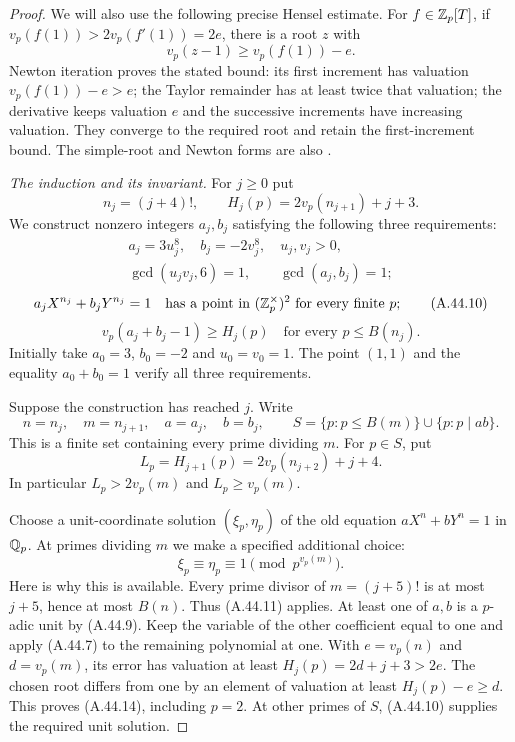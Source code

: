 \begin{proof}
We will also use the following precise Hensel estimate.
For $f\in\mathbb Z_p[T]$, if
$v_p(f(1))>2v_p(f'(1))=2e$, there is a root $z$
with
\[
                 v_p(z-1)\ge v_p(f(1))-e.
 \tag{A.44.7}
\]
Newton iteration proves the stated bound: its first
increment has valuation $v_p(f(1))-e>e$; the Taylor
remainder has at least twice that valuation; the
derivative keeps valuation $e$ and the successive
increments have increasing valuation. They converge
to the required root and retain the first-increment
bound. The simple-root and Newton forms are also
\cite[Proposition 7.31 and Theorem 7.32]{AgentMilneANT}.

\emph{The induction and its invariant.}
For $j\ge0$ put
\[
 n_j=(j+4)!,\qquad
 H_j(p)=2v_p(n_{j+1})+j+3.
 \tag{A.44.8}
\]
We construct nonzero integers $a_j,b_j$ satisfying
the following three requirements:
\[
 \begin{gathered}
 a_j=3u_j^8,\quad b_j=-2v_j^8,\quad u_j,v_j>0,\\
 \gcd(u_jv_j,6)=1,\qquad \gcd(a_j,b_j)=1;
 \end{gathered}
 \tag{A.44.9}
\]
\[
 a_jX^{n_j}+b_jY^{n_j}=1
 \quad\text{has a point in }(\mathbb Z_p^\times)^2
       \text{ for every finite }p;
 \tag{A.44.10}
\]
\[
 v_p(a_j+b_j-1)\ge H_j(p)
       \quad\text{for every }p\le B(n_j).
 \tag{A.44.11}
\]
Initially take $a_0=3$, $b_0=-2$ and
$u_0=v_0=1$. The point $(1,1)$ and the equality
$a_0+b_0=1$ verify all three requirements.

Suppose the construction has reached $j$. Write
\[
 n=n_j,\quad m=n_{j+1},\quad a=a_j,\quad b=b_j,
 \qquad
 S=\{p:p\le B(m)\}\cup\{p:p\mid ab\}.
 \tag{A.44.12}
\]
This is a finite set containing every prime dividing
$m$. For $p\in S$, put
\[
 L_p=H_{j+1}(p)=2v_p(n_{j+2})+j+4.
 \tag{A.44.13}
\]
In particular $L_p>2v_p(m)$ and
$L_p\ge v_p(m)$.

Choose a unit-coordinate solution $(\xi_p,\eta_p)$
of the old equation $aX^n+bY^n=1$ in $\mathbb Q_p$.
At primes dividing $m$ we make a specified additional
choice:
\[
        \xi_p\equiv\eta_p\equiv1\pmod {p^{v_p(m)}}.
 \tag{A.44.14}
\]
Here is why this is available. Every prime divisor of
$m=(j+5)!$ is at most $j+5$, hence at most $B(n)$.
Thus (A.44.11) applies. At least one of $a,b$ is a
$p$-adic unit by (A.44.9). Keep the variable of the
other coefficient equal to one and apply (A.44.7) to
the remaining polynomial at one. With
$e=v_p(n)$ and $d=v_p(m)$, its error has valuation
at least $H_j(p)=2d+j+3>2e$. The chosen root differs
from one by an element of valuation at least
$H_j(p)-e\ge d$. This proves (A.44.14), including
$p=2$. At other primes of $S$, (A.44.10) supplies
the required unit solution.


\end{proof}
